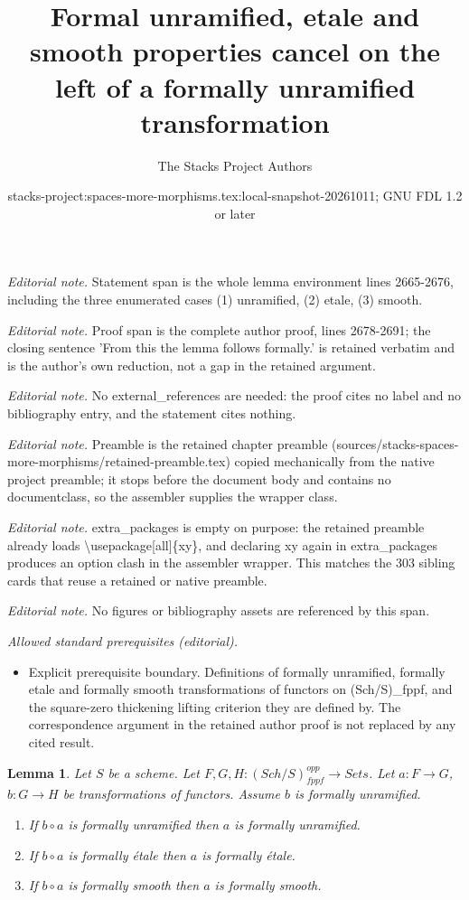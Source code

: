 \documentclass[10pt,a4paper]{amsart}
\title{Formal unramified, etale and smooth properties cancel on the left of a formally unramified transformation}
\author{The Stacks Project Authors}
\date{stacks-project:spaces-more-morphisms.tex:local-snapshot-20261011; GNU FDL 1.2 or later}
\theoremstyle{plain}
\newtheorem{lemma}[subsection]{Lemma}
\theoremstyle{definition}
\theoremstyle{remark}
\numberwithin{equation}{subsection}
\def\Sch{\mathit{Sch}}
\begin{document}
\maketitle
\noindent\textit{Editorial note.} Statement span is the whole lemma environment lines 2665-2676, including the three enumerated cases (1) unramified, (2) etale, (3) smooth.\par\medskip
\noindent\textit{Editorial note.} Proof span is the complete author proof, lines 2678-2691; the closing sentence 'From this the lemma follows formally.' is retained verbatim and is the author's own reduction, not a gap in the retained argument.\par\medskip
\noindent\textit{Editorial note.} No external\_references are needed: the proof cites no label and no bibliography entry, and the statement cites nothing.\par\medskip
\noindent\textit{Editorial note.} Preamble is the retained chapter preamble (sources/stacks-spaces-more-morphisms/retained-preamble.tex) copied mechanically from the native project preamble; it stops before the document body and contains no documentclass, so the assembler supplies the wrapper class.\par\medskip
\noindent\textit{Editorial note.} extra\_packages is empty on purpose: the retained preamble already loads \textbackslash{}usepackage[all]\{xy\}, and declaring xy again in extra\_packages produces an option clash in the assembler wrapper. This matches the 303 sibling cards that reuse a retained or native preamble.\par\medskip
\noindent\textit{Editorial note.} No figures or bibliography assets are referenced by this span.\par\medskip
\noindent\textit{Allowed standard prerequisites (editorial).}\begin{itemize}
\item Explicit prerequisite boundary. Definitions of formally unramified, formally etale and formally smooth transformations of functors on (Sch/S)\_fppf, and the square-zero thickening lifting criterion they are defined by. The correspondence argument in the retained author proof is not replaced by any cited result.
\end{itemize}\medskip
\begin{lemma}
\label{lemma-formally-permanence}
Let $S$ be a scheme.
Let $F, G, H : (\Sch/S)_{fppf}^{opp} \to \textit{Sets}$.
Let $a : F \to G$, $b : G \to H$ be transformations of functors.
Assume $b$ is formally unramified.
\begin{enumerate}
\item If $b \circ a$ is formally unramified then $a$ is formally unramified.
\item If $b \circ a$ is formally \'etale then $a$ is formally \'etale.
\item If $b \circ a$ is formally smooth then $a$ is formally smooth.
\end{enumerate}
\end{lemma}
\end{document}
